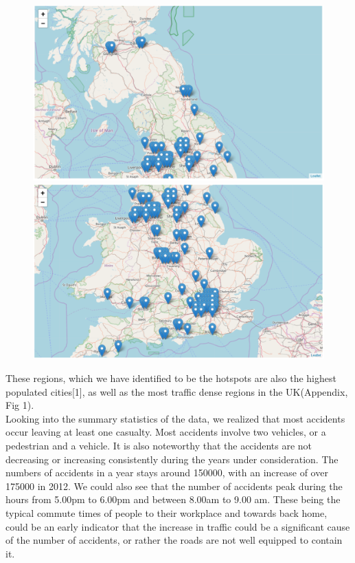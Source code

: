 \documentclass{neu_handout}
\begin{document}
\begin{figure}[!htb]
  \includegraphics[width=\linewidth]{map1.png}
  \endminipage\hfill
{}
  \includegraphics[width=\linewidth]{map2.png}
\endminipage
\end{figure}

These regions, which we have identified to be the hotspots are also the highest populated cities[1], as well as the most traffic dense regions in the UK(Appendix, Fig 1). \\

Looking into the summary statistics of the data, we realized that most accidents occur leaving at least one casualty. Most accidents involve two vehicles, or a pedestrian and a vehicle. It is also noteworthy that the accidents are not decreasing or increasing consistently during the years under consideration. The numbers of accidents in a year stays around 150000, with  an increase of over 175000 in 2012. We could also see that the number of accidents peak during the hours from 5.00pm to 6.00pm and between 8.00am to 9.00 am. These being the typical commute times of people to their workplace and towards back home, could be an early indicator that the increase in traffic could be a significant cause of the number of accidents, or rather the roads are not well equipped to contain it. \\
\end{document}
